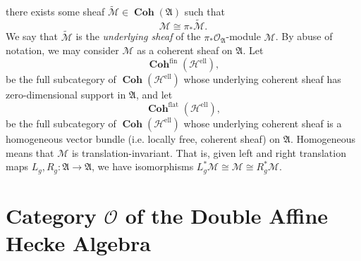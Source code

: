 \documentclass[a4paper]{report}
\theoremstyle{theorem}
\theoremstyle{definition}
\theoremstyle{remark}
\theoremstyle{proposition}
\theoremstyle{conjecture}
\theoremstyle{lemma}
\theoremstyle{corollary}
\theoremstyle{exercise}
\theoremstyle{example}
\newcommand{\mcal}{\mathcal}
\newcommand{\on}{\operatorname}
\newcommand{\coh}{\on{\mathbf{Coh}}}
\begin{document}
  there exists some sheaf $\widetilde{\mcal{M}} \in \coh(\mathfrak{A})$ such that $$\mcal{M} \cong \pi_\ast\widetilde{\mcal{M}}.$$
  We say that $\widetilde{\mcal{M}}$ is the \emph{underlying sheaf} of the $\pi_\ast\mcal{O}_{\mathfrak{A}}$-module $\mcal{M}$.
  By abuse of notation, we may consider $\mcal{M}$ as a coherent sheaf on $\mathfrak{A}$.
  Let $$\coh^{\on{fin}}(\mcal{H}^{\on{ell}}),$$
  be the full subcategory of $\coh(\mcal{H}^{\on{ell}})$ whose underlying
  coherent sheaf has zero-dimensional support in $\mathfrak{A}$, and let 
  $$\coh^{\on{flat}}(\mcal{H}^{\on{ell}}),$$
  be the full subcategory of $\coh(\mcal{H}^{\on{ell}})$ whose underlying coherent
  sheaf is a homogeneous vector bundle (i.e. locally free, coherent sheaf)
  on $\mathfrak{A}$. Homogeneous means that $\mcal{M}$ is translation-invariant. That is,
  given left and right translation maps $L_g, R_g : \mathfrak{A} \to \mathfrak{A}$, we have isomorphisms
  $L_g^\ast \mcal{M} \cong \mcal{M} \cong R_g^\ast \mcal{M}$.
  
  \chapter{Category $\mcal{O}$ of the Double Affine Hecke Algebra}\label{chap2}
  
\end{document}

